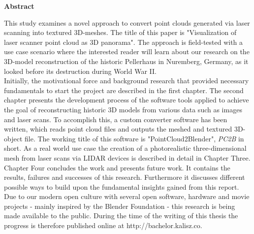 \thispagestyle{plain}
\begin{center}
	
	\LARGE
	\textbf{Abstract}
	
\end{center}
\vspace{100pt}

This study examines a novel approach to convert point clouds generated via laser scanning into textured 3D-meshes. The title of this paper is "Visualization of laser scanner point cloud as 3D panorama".
The approach is field-tested with a use case scenario where the interested reader will learn about our research on the 3D-model reconstruction of the historic Pellerhaus in Nuremberg, Germany, as it looked before its destruction during World War II.\\

Initially, the motivational force and background research that provided necessary fundamentals to start the project are described in the first chapter.
The second chapter presents the development process of the software tools applied to achieve the goal of reconstructing historic 3D models from various data such as images and laser scans. To accomplish this, a custom converter software has been written, which reads point cloud files and outputs the meshed and textured 3D-object file. The working title of this software is "PointCloud2Blender", \textit{PC2B} in short.
As a real world use case the creation of a photorealistic three-dimensional mesh from laser scans via LIDAR devices is described in detail in Chapter Three.
Chapter Four concludes the work and presents future work. It contains the results, failures and successes of this research. Furthermore it discusses different possible ways to build upon the fundamental insights gained from this report.\\

Due to our modern open culture with several open software, hardware and movie projects - mainly inspired by the Blender Foundation - this research is being made available to the public. During the time of the writing of this thesis the progress is therefore published online at http://bachelor.kalisz.co.
